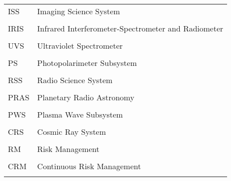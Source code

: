 \begin{table}[h]
\begin{center}
\begin{tabular}{ L{4cm} L{10cm}}
            ISS & Imaging Science System \\ \\
            
            IRIS & Infrared Interferometer-Spectrometer and Radiometer \\ \\
            
            UVS & Ultraviolet Spectrometer \\ \\
            
            PS & Photopolarimeter Subsystem \\ \\
            
            RSS & Radio Science System \\ \\
            
            PRAS & Planetary Radio Astronomy \\ \\
            
            PWS & Plasma Wave Subsystem \\ \\
             
            CRS & Cosmic Ray System \\ \\
            
            RM & Risk Management \\ \\
            
            CRM & Continuous Risk Management \\ \\
        \end{tabular}
            \label{table:30}
    \end{center}
\end{table}


\clearpage